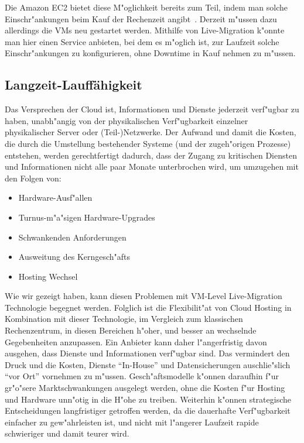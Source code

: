\documentclass[draft,journal]{IEEEtran}
\begin{document}
Die Amazon EC2 bietet diese M"oglichkeit bereits zum Teil, indem man
solche Einschr"ankungen beim Kauf der Rechenzeit
angibt~\cite{none}. Derzeit m"ussen dazu allerdings die VMs neu
gestartet werden. Mithilfe von Live-Migration k"onnte man hier einen
Service anbieten, bei dem es m"oglich ist, zur Laufzeit solche
Einschr"ankungen zu konfigurieren, ohne Downtime in Kauf nehmen zu
m"ussen.

\subsection{Langzeit-Lauffähigkeit}
\label{sec:langz-lauff}
Das Versprechen der Cloud ist, Informationen und Dienste jederzeit
verf"ugbar zu haben, unabh"angig von der physikalischen Verf"ugbarkeit
einzelner physikalischer Server oder (Teil-)Netzwerke. Der Aufwand und
damit die Kosten, die durch die Umstellung bestehender Systeme (und
der zugeh"origen Prozesse) entstehen, werden gerechtfertigt dadurch,
dass der Zugang zu kritischen Diensten und Informationen nicht alle
paar Monate unterbrochen wird, um umzugehen mit den Folgen von:
\begin{itemize}
\item Hardware-Ausf"allen
\item Turnus-m"a"sigen Hardware-Upgrades
\item Schwankenden Anforderungen
\item Ausweitung des Kerngesch"afts
\item Hosting Wechsel
\end{itemize}

Wie wir gezeigt haben, kann diesen Problemen mit VM-Level
Live-Migration Technologie begegnet werden. Folglich ist die
Flexibilit"at von Cloud Hosting in Kombination mit dieser Technologie,
im Vergleich zum klassischen Rechenzentrum, in diesen Bereichen
h"oher, und besser an wechselnde Gegebenheiten anzupassen. Ein
Anbieter kann daher l"angerfristig davon ausgehen, dass Dienste und
Informationen verf"ugbar sind. Das vermindert den Druck und die
Kosten, Dienste "`In-House"' und Datensicherungen auschlie"slich "`vor
Ort"' vornehmen zu m"ussen. Gesch"aftsmodelle k"onnen daraufhin f"ur
gr"o"sere Marktschwankungen ausgelegt werden, ohne die Kosten f"ur
Hosting und Hardware unn"otig in die H"ohe zu treiben. Weiterhin
k"onnen strategische Entscheidungen langfristiger getroffen werden, da
die dauerhafte Verf"ugbarkeit einfacher zu gew"ahrleisten ist, und
nicht mit l"angerer Laufzeit rapide schwieriger und damit teurer wird.
\end{document}
